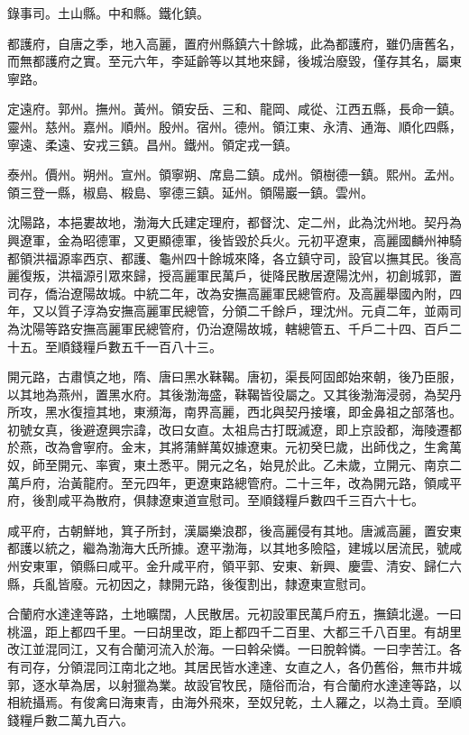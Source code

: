 \begin{pinyinscope}
 錄事司。土山縣。中和縣。鐵化鎮。



 都護府，自唐之季，地入高麗，置府州縣鎮六十餘城，此為都護府，雖仍唐舊名，而無都護府之實。至元六年，李延齡等以其地來歸，後城治廢毀，僅存其名，屬東寧路。



 定遠府。郭州。撫州。黃州。領安岳、三和、龍岡、咸從、江西五縣，長命一鎮。靈州。慈州。嘉州。順州。殷州。宿州。德州。領江東、永清、通海、順化四縣，寧遠、柔遠、安戎三鎮。昌州。鐵州。領定戎一鎮。



 泰州。價州。朔州。宣州。領寧朔、席島二鎮。成州。領樹德一鎮。熙州。孟州。領三登一縣，椒島、椴島、寧德三鎮。延州。領陽巖一鎮。雲州。



 沈陽路，本挹婁故地，渤海大氏建定理府，都督沈、定二州，此為沈州地。契丹為興遼軍，金為昭德軍，又更顯德軍，後皆毀於兵火。元初平遼東，高麗國麟州神騎都領洪福源率西京、都護、龜州四十餘城來降，各立鎮守司，設官以撫其民。後高麗復叛，洪福源引眾來歸，授高麗軍民萬戶，徙降民散居遼陽沈州，初創城郭，置司存，僑治遼陽故城。中統二年，改為安撫高麗軍民總管府。及高麗舉國內附，四年，又以質子淳為安撫高麗軍民總管，分領二千餘戶，理沈州。元貞二年，並兩司為沈陽等路安撫高麗軍民總管府，仍治遼陽故城，轄總管五、千戶二十四、百戶二十五。至順錢糧戶數五千一百八十三。



 開元路，古肅慎之地，隋、唐曰黑水靺鞨。唐初，渠長阿固郎始來朝，後乃臣服，以其地為燕州，置黑水府。其後渤海盛，靺鞨皆役屬之。又其後渤海浸弱，為契丹所攻，黑水復擅其地，東瀕海，南界高麗，西北與契丹接壤，即金鼻祖之部落也。初號女真，後避遼興宗諱，改曰女直。太祖烏古打既滅遼，即上京設都，海陵遷都於燕，改為會寧府。金末，其將蒲鮮萬奴據遼東。元初癸巳歲，出師伐之，生禽萬奴，師至開元、率賓，東土悉平。開元之名，始見於此。乙未歲，立開元、南京二萬戶府，治黃龍府。至元四年，更遼東路總管府。二十三年，改為開元路，領咸平府，後割咸平為散府，俱隸遼東道宣慰司。至順錢糧戶數四千三百六十七。



 咸平府，古朝鮮地，箕子所封，漢屬樂浪郡，後高麗侵有其地。唐滅高麗，置安東都護以統之，繼為渤海大氏所據。遼平渤海，以其地多險隘，建城以居流民，號咸州安東軍，領縣曰咸平。金升咸平府，領平郭、安東、新興、慶雲、清安、歸仁六縣，兵亂皆廢。元初因之，隸開元路，後復割出，隸遼東宣慰司。



 合蘭府水達達等路，土地曠闊，人民散居。元初設軍民萬戶府五，撫鎮北邊。一曰桃溫，距上都四千里。一曰胡里改，距上都四千二百里、大都三千八百里。有胡里改江並混同江，又有合蘭河流入於海。一曰斡朵憐。一曰脫斡憐。一曰孛苦江。各有司存，分領混同江南北之地。其居民皆水達達、女直之人，各仍舊俗，無市井城郭，逐水草為居，以射獵為業。故設官牧民，隨俗而治，有合蘭府水達達等路，以相統攝焉。有俊禽曰海東青，由海外飛來，至奴兒乾，土人羅之，以為土貢。至順錢糧戶數二萬九百六。




\end{pinyinscope}
